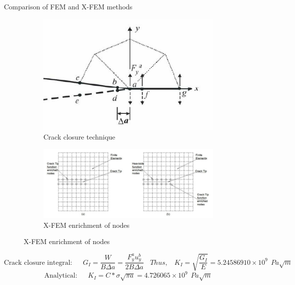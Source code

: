 \documentclass{beamer}
\begin{document}
\begin{frame}[t,fragile]{Comparison of FEM and X-FEM methods}
    \vspace{-.9cm}
    \hspace{15pt}
        \begin{figure}[H]
  \begin{subfigure}{0.45\textwidth}
    \centering
       \includegraphics[scale=.2]{crackclosure.png}
    \caption{\tiny Crack closure technique}
\end{subfigure}
        \hspace{15pt}
      \begin{subfigure}{0.45\textwidth}
    \centering
        \includegraphics[scale=.15]{k.png}
    \caption{\tiny X-FEM enrichment of nodes}
\end{subfigure}
\end{figure}
\vspace{-12pt}
    \tiny    
$$
        \text{Crack closure integral:}\ \ \ \ \ \ \ G_I=\frac{W}{B\Delta a}=\frac{F_{y}^au_{y}^b}{2B \Delta a}\ \ \ \
    Thus, \ \ \ \
    K_I=\sqrt{\frac{G_I}{E}}=5.24586910\times 10^9\ \ Pa\sqrt{m}$$ $$ 
       \text{Analytical:}\ \ \ \ \ \ \ K_I=C*\sigma\sqrt{\pi a}=4.726065 \times 10^9\ \ Pa\sqrt{m}
    $$
\vspace{-10pt}
\bgroup 
\def\arraystretch{2}   
\begin{table}[H]

\end{table}
\end{frame}
\end{document}
